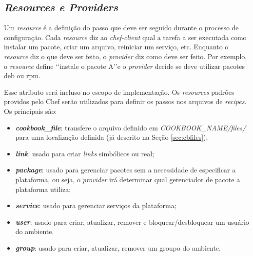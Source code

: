 
\subsection{\textit{Resources e Providers}}
\label{sec:cbresource}

Um \textit{resource} é a definição do passo que deve ser seguido durante o processo
de configuração. Cada \textit{resource} diz ao \textit{chef-client} qual a tarefa a ser executada
como instalar um pacote, criar um arquivo, reiniciar um serviço, etc.
Enquanto o \textit{resource} diz o que deve ser feito, o \textit{provider} diz como deve ser
feito. Por exemplo, o \textit{resource} define \lq\lq instale o pacote A\rq\rq e o \textit{provider} decide
se deve utilizar pacotes deb ou rpm.

Esse atributo será incluso no escopo de implementação. Os \textit{resources} padrões
providos pelo Chef serão utilizados para definir os passos nos arquivos de
\textit{recipes}. Os principais são:

\begin{itemize}
  \item \textit{\textbf{cookbook\_file}}: transfere o arquivo definido em \textit{COOKBOOK\_NAME/files/} para
    uma localização definida (já descrito na Seção \ref{sec:cbfiles});
  \item \textit{\textbf{link}}: usado para criar \textit{links} simbólicos ou real;
  \item \textit{\textbf{package}}: usado para gerenciar pacotes sem a necessidade de especificar a plataforma,
    ou seja, o \textit{provider} irá determinar qual gerenciador de pacote a plataforma utiliza;
  \item \textit{\textbf{service}}: usado para gerenciar serviços da plataforma;
  \item \textit{\textbf{user}}: usado para criar, atualizar, remover e bloquear/desbloquear um usuário do ambiente.
  \item \textit{\textbf{group}}: usado para criar, atualizar, remover um groupo do ambiente.
\end{itemize}
